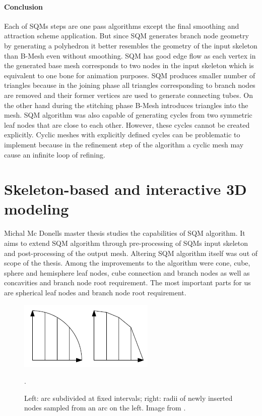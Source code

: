 \paragraph{Conclusion}
Each of SQMs steps are one pass algorithms except the final smoothing and attraction scheme application. But since SQM generates branch node geometry by generating a polyhedron it better resembles the geometry of the input skeleton than B-Mesh even without smoothing.
SQM has good edge flow as each vertex in the generated base mesh corresponds to two nodes in the input skeleton which is equivalent to one bone for animation purposes.
SQM produces smaller number of triangles because in the joining phase all triangles corresponding to branch nodes are removed and their former vertices are used to generate connecting tubes. On the other hand during the stitching phase B-Mesh introduces triangles into the mesh.
SQM algorithm was also capable of generating cycles from two symmetric leaf nodes that are close to each other.
However, these cycles cannot be created explicitly.
Cyclic meshes with explicitly defined cycles can be problematic to implement because in the refinement step of the algorithm a cyclic mesh may cause an infinite loop of refining.

\section{Skeleton-based and interactive 3D modeling} 
Michal Mc Donells master thesis studies the capabilities of SQM algorithm. It aims to extend SQM algorithm through pre-processing of SQMs input skeleton and post-processing of the output mesh. Altering SQM algorithm itself was out of scope of the thesis. Among the improvements to the algorithm were cone, cube, sphere and hemisphere leaf nodes, cube connection and branch nodes as well as concavities and branch node root requirement. The most important parts for us are spherical leaf nodes and branch node root requirement.

\begin{figure}[h]
    \centering
    \includegraphics[]{images/spherical_node.png}
    \caption[Spherical nodes radii]{Left: arc subdivided at fixed intervals; right: radii of newly inserted nodes sampled from an arc on the left. Image from \cite{sqm_phd}.}.
    \label{fig:esqm_spherical}
\end{figure}

